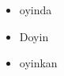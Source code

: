 \documentclass{article}
\begin{document}
	\begin{itemize}
		\item oyinda
		\item Doyin
		\item oyinkan
	\end{itemize}
\end{document}
